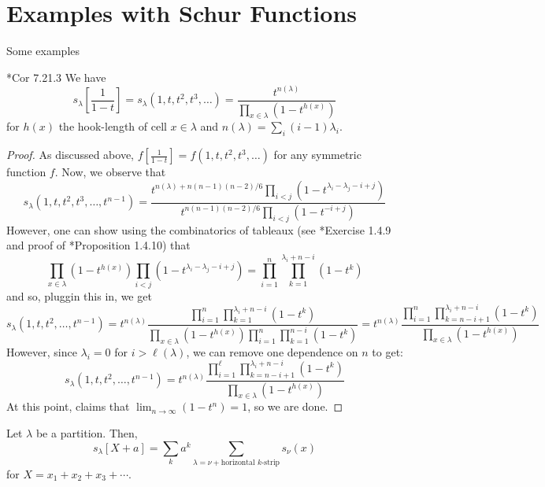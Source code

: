 \documentclass[11pt,leqno,oneside]{amsart}
\numberwithin{thm}{section}
\begin{document}
\section{Examples with Schur Functions}
Some examples
\begin{prop}
  \cite{stanley}*{Cor 7.21.3} We have \[
    s_\lambda\left[\frac{1}{1-t}\right] =
    s_\lambda(1,t,t^2,t^3,\ldots) = \frac{t^{n(\lambda)}}{\prod_{x \in
      \lambda} (1-t^{h(x)})}
\]
for \(h(x)\) the hook-length of cell \(x \in \lambda\) and
\(n(\lambda) = \sum_i (i-1)\lambda_i\).
\end{prop}
\begin{proof}
  As discussed above, \(f\left[ \frac{1}{1-t} \right] =
  f(1,t,t^2,t^3,\ldots)\) for any symmetric function \(f\). Now, 
  we observe that \[
    s_\lambda(1,t,t^2,t^3, \ldots, t^{n-1}) =
    \frac{t^{n(\lambda)+n(n-1)(n-2)/6 }\prod_{i <
          j}(1-t^{\lambda_i-\lambda_j-i+j})}{t^{n(n-1)(n-2)/6}\prod_{i<j}(1-t^{-i+j})}
    \]
    However, one can show using the combinatorics of tableaux (see
    \cite{manivel}*{Exercise 1.4.9} and proof of \cite{manivel}*{Proposition 1.4.10}) that \[
      \prod_{x \in \lambda}(1-t^{h(x)})
      \prod_{i<j}(1-t^{\lambda_i-\lambda_j-i+j}) = \prod_{i=1}^n \prod_{k=1}^{\lambda_i+n-i}(1-t^k)
    \]
    and so, pluggin this in, we get \[
      s_\lambda(1,t,t^2,\ldots,t^{n-1}) =  t^{n(\lambda)}
      \frac{\prod_{i=1}^n \prod_{k=1}^{\lambda_i+n-i}(1-t^k)}{\prod_{x
        \in \lambda} (1-t^{h(x)}) \prod_{i=1}^n
      \prod_{k=1}^{n-i}(1-t^k) } = t^{n(\lambda)} \frac{\prod_{i=1}^n
      \prod_{k=n-i+1}^{\lambda_i+n-i}(1-t^k)}{\prod_{x \in \lambda}(1-t^{h(x)})}
  \]
  However, since \(\lambda_i = 0\) for \(i > \ell(\lambda)\), we can
  remove one dependence on \(n\) to get: \[
      s_\lambda(1,t,t^2,\ldots,t^{n-1}) = t^{n(\lambda)} \frac{\prod_{i=1}^\ell
      \prod_{k=n-i+1}^{\lambda_i+n-i}(1-t^k)}{\prod_{x \in \lambda}(1-t^{h(x)})}
  \]
  At this point, \cite{stanley} claims that \(\lim_{n \to \infty}
  (1-t^{n}) = 1\), so we are done.  
\end{proof}
\begin{prop}
  Let \(\lambda\) be a partition. Then, \[
    s_\lambda[X+a] = \sum_k a^k \sum_{\lambda = \nu+\text{horizontal }k\text{-strip}} s_\nu(x)
  \]
  for \(X = x_1+x_2+x_3+\cdots\).
\end{prop}
\end{document}

